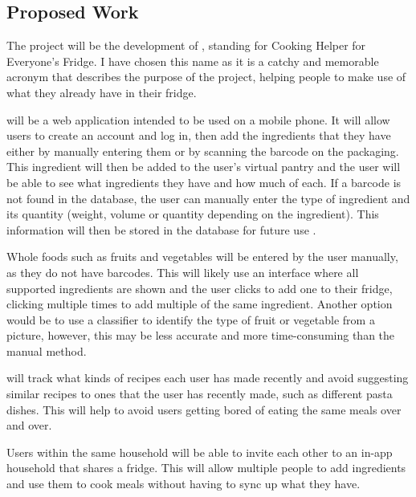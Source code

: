 \documentclass[../CHEFCookingHelperForEveryonesFridge.tex]{subfiles}
\begin{document}
\subsection{Proposed Work}

The project will be the development of \chef{}, standing for Cooking Helper for Everyone's Fridge. I have chosen this name
as it is a catchy and memorable acronym that describes the purpose of the project, helping people to make use of
what they already have in their fridge.

\chef{} will be a web application intended to be used on a mobile phone. It will allow users to create an account and log in,
then add the ingredients that they have either by manually entering them or by scanning the barcode on the packaging.
This ingredient will then be added to the user's virtual pantry and the user will be able to see what ingredients they have and how much of each.
If a barcode is not found in the database, the user can manually enter the type of ingredient and its quantity (weight, volume or quantity depending on the ingredient).
This information will then be stored in the database for future use .

Whole foods such as fruits and vegetables will be entered by the user manually, as they do not have barcodes. This will likely use an interface where
all supported ingredients are shown and the user clicks to add one to their fridge, clicking multiple times to add multiple of the same ingredient.
Another option would be to use a classifier to identify the type of fruit or vegetable from a picture, however, this may be less accurate and more
time-consuming than the manual method.

\chef{} will track what kinds of recipes each user has made recently and avoid suggesting similar recipes
to ones that the user has recently made, such as different pasta dishes. This will help to avoid users
getting bored of eating the same meals over and over.

Users within the same household will be able to invite each other to an in-app household that shares a fridge.
This will allow multiple people to add ingredients and use them to cook meals without having to sync up
what they have.
\end{document}
